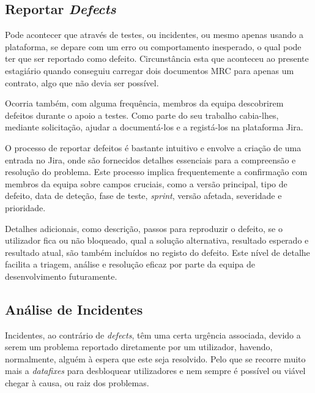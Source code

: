     \subsection{Reportar \textit{Defects}}\label{sub:reportar_defects}

        Pode acontecer que através de testes, ou incidentes, ou mesmo apenas usando a plataforma, se depare com um erro ou comportamento inesperado, o qual pode ter que ser reportado como defeito. Circunstância esta que aconteceu ao presente estagiário quando conseguiu carregar dois documentos MRC para apenas um contrato, algo que não devia ser possível. 
        
        Ocorria também, com alguma frequência, membros da equipa descobrirem defeitos durante o apoio a testes. Como parte do seu trabalho cabia-lhes, mediante solicitação,  
        ajudar a documentá-los e a registá-los na plataforma Jira.

        O processo de reportar defeitos é bastante intuitivo e envolve a criação de uma entrada no Jira, onde são fornecidos detalhes essenciais para a compreensão e resolução do problema. Este processo implica frequentemente a confirmação com membros da equipa sobre campos cruciais, como a versão principal, tipo de defeito, data de deteção, fase de teste, \textit{sprint}, versão afetada, severidade e prioridade.

        Detalhes adicionais, como descrição, passos para reproduzir o defeito, se o utilizador fica ou não bloqueado, qual a solução alternativa, resultado esperado e resultado atual, são também incluídos no registo do defeito. Este nível de detalhe facilita a triagem, análise e resolução eficaz por parte da equipa de desenvolvimento futuramente.



    \subsection{Análise de Incidentes}\label{sub:incidentes}

        Incidentes, ao contrário de \textit{defects}, têm uma certa urgência associada, devido a serem um problema reportado diretamente por um utilizador, havendo, normalmente, alguém à espera que este seja resolvido. Pelo que se recorre muito mais a \textit{datafixes} para desbloquear utilizadores e nem sempre é possível ou viável chegar à causa, ou raiz dos problemas.

